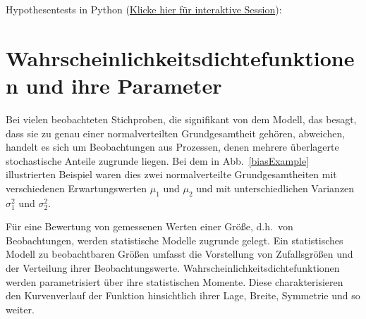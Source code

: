 Hypothesentests in Python (\href{https://mybinder.org/v2/gh/dhueser/MDA-Vorlesung-iprom-tu-bs/master?urlpath=/lab/tree/vorlesung/05_vorlesung/code/hypothesentests.ipynb}{Klicke hier für interaktive Session}):



\section{Wahrscheinlichkeitsdichtefunktionen und ihre Parameter}

Bei vielen beobachteten Stichproben, die signifikant von dem Modell, das besagt, dass sie zu genau einer
normalverteilten Grundgesamtheit gehören, abweichen, handelt
es sich um Beobachtungen aus Prozessen, denen mehrere überlagerte stochastische Anteile
zugrunde liegen. Bei dem in Abb.~\ref{biasExample} illustrierten Beispiel waren dies
zwei normalverteilte Grundgesamtheiten mit verschiedenen Erwartungswerten $\mu_1$ und
$\mu_2$ und mit unterschiedlichen Varianzen $\sigma^2_1$ und $\sigma^2_2$.

Für eine Bewertung von gemessenen Werten einer Größe, d.h.\ von Beobachtungen, werden statistische
Modelle zugrunde gelegt. Ein statistisches Modell zu beobachtbaren Größen umfasst die
Vorstellung von Zufallsgrößen und der Verteilung ihrer Beobachtungswerte.
Wahrscheinlichkeitsdichtefunktionen werden parametrisiert über ihre statistischen Momente.
Diese charakterisieren den Kurvenverlauf der Funktion hinsichtlich ihrer Lage, Breite,
Symmetrie und so weiter.

